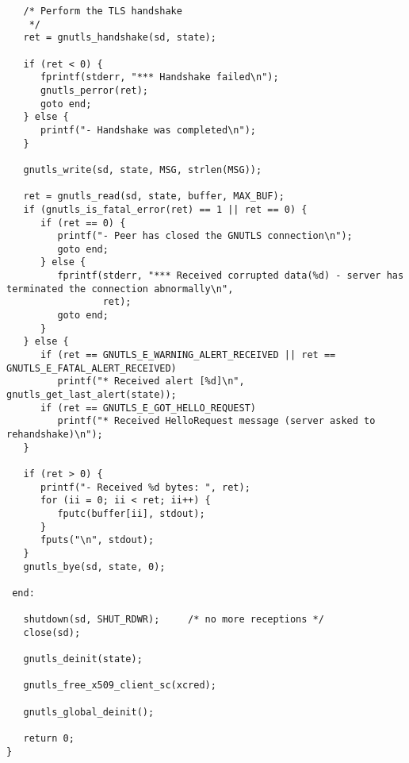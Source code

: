 \begin{verbatim}
   /* Perform the TLS handshake
    */
   ret = gnutls_handshake(sd, state);

   if (ret < 0) {
      fprintf(stderr, "*** Handshake failed\n");
      gnutls_perror(ret);
      goto end;
   } else {
      printf("- Handshake was completed\n");
   }

   gnutls_write(sd, state, MSG, strlen(MSG));

   ret = gnutls_read(sd, state, buffer, MAX_BUF);
   if (gnutls_is_fatal_error(ret) == 1 || ret == 0) {
      if (ret == 0) {
         printf("- Peer has closed the GNUTLS connection\n");
         goto end;
      } else {
         fprintf(stderr, "*** Received corrupted data(%d) - server has terminated the connection abnormally\n",
                 ret);
         goto end;
      }
   } else {
      if (ret == GNUTLS_E_WARNING_ALERT_RECEIVED || ret == GNUTLS_E_FATAL_ALERT_RECEIVED)
         printf("* Received alert [%d]\n", gnutls_get_last_alert(state));
      if (ret == GNUTLS_E_GOT_HELLO_REQUEST)
         printf("* Received HelloRequest message (server asked to rehandshake)\n");
   }

   if (ret > 0) {
      printf("- Received %d bytes: ", ret);
      for (ii = 0; ii < ret; ii++) {
         fputc(buffer[ii], stdout);
      }
      fputs("\n", stdout);
   }
   gnutls_bye(sd, state, 0);

 end:

   shutdown(sd, SHUT_RDWR);     /* no more receptions */
   close(sd);

   gnutls_deinit(state);

   gnutls_free_x509_client_sc(xcred);

   gnutls_global_deinit();

   return 0;
}

\end{verbatim}
